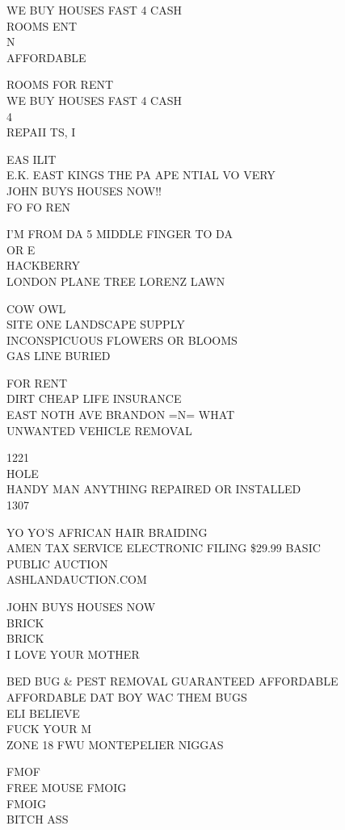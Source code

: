 \documentclass[10pt,letterpaper]{article}
\begin{document}
WE BUY HOUSES FAST 4 CASH\\
ROOMS ENT\\
N\\
AFFORDABLE

ROOMS FOR RENT\\
WE BUY HOUSES FAST 4 CASH\\
4\\
REPAII TS, I

EAS ILIT\\
E.K. EAST KINGS THE PA APE NTIAL VO VERY\\
JOHN BUYS HOUSES NOW!!\\
FO FO REN

I'M FROM DA 5 MIDDLE FINGER TO DA\\
OR E\\
HACKBERRY\\
LONDON PLANE TREE LORENZ LAWN

COW OWL\\
SITE ONE LANDSCAPE SUPPLY\\
INCONSPICUOUS FLOWERS OR BLOOMS\\
GAS LINE BURIED

FOR RENT\\
DIRT CHEAP LIFE INSURANCE\\
EAST NOTH AVE BRANDON =N= WHAT\\
UNWANTED VEHICLE REMOVAL

1221\\
HOLE\\
HANDY MAN ANYTHING REPAIRED OR INSTALLED\\
1307

YO YO'S AFRICAN HAIR BRAIDING\\
AMEN TAX SERVICE ELECTRONIC FILING \$29.99 BASIC\\
PUBLIC AUCTION\\
ASHLANDAUCTION.COM

JOHN BUYS HOUSES NOW\\
BRICK\\
BRICK\\
I LOVE YOUR MOTHER

BED BUG \& PEST REMOVAL GUARANTEED AFFORDABLE AFFORDABLE DAT BOY WAC THEM BUGS\\
ELI BELIEVE\\
FUCK YOUR M\\
ZONE 18 FWU MONTEPELIER NIGGAS

FMOF\\
FREE MOUSE FMOIG\\
FMOIG\\
BITCH ASS
\end{document}
